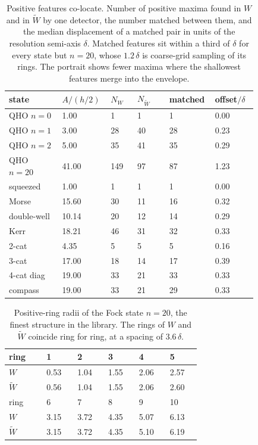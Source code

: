\documentclass[%
  aps, amsmath, amssymb, onecolumn, 11pt
]{revtex4-2}
\begin{document}
\begin{table}[ht]
\centering
\renewcommand{\arraystretch}{1.2}
\begin{tabular}{@{}p{0.20\linewidth} p{0.13\linewidth} p{0.10\linewidth} p{0.12\linewidth} p{0.12\linewidth} p{0.16\linewidth}@{}}
\toprule
state & $A/(h/2)$ & $N_W$ & $N_{\widetilde W}$ & matched & offset$/\delta$ \\
\midrule
QHO $n=0$    & 1.00  & 1   & 1  & 1  & 0.00 \\
QHO $n=1$    & 3.00  & 28  & 40 & 28 & 0.23 \\
QHO $n=2$    & 5.00  & 35  & 41 & 35 & 0.29 \\
QHO $n=20$   & 41.00 & 149 & 97 & 87 & 1.23 \\
squeezed     & 1.00  & 1   & 1  & 1  & 0.00 \\
Morse        & 15.60 & 30  & 11 & 16 & 0.32 \\
double-well  & 10.14 & 20  & 12 & 14 & 0.29 \\
Kerr         & 18.21 & 46  & 31 & 32 & 0.33 \\
2-cat        & 4.35  & 5   & 5  & 5  & 0.16 \\
3-cat        & 17.00 & 18  & 14 & 17 & 0.39 \\
4-cat diag   & 19.00 & 33  & 21 & 33 & 0.33 \\
compass      & 19.00 & 33  & 21 & 29 & 0.33 \\
\bottomrule
\end{tabular}
\caption{Positive features co-locate. Number of positive maxima found in $W$
and in $\widetilde W$ by one detector, the number matched between them, and the
median displacement of a matched pair in units of the resolution semi-axis $\delta$.
Matched features sit within a third of $\delta$ for every state but $n=20$,
whose $1.2\,\delta$ is coarse-grid sampling of its rings. The portrait shows
fewer maxima where the shallowest features merge into the envelope.}
\label{tab:coloc}
\end{table}

\begin{table}[ht]
\centering
\renewcommand{\arraystretch}{1.2}
\begin{tabular}{@{}p{0.14\linewidth} p{0.10\linewidth} p{0.10\linewidth} p{0.10\linewidth} p{0.10\linewidth} p{0.10\linewidth}@{}}
\toprule
ring & 1 & 2 & 3 & 4 & 5 \\
\midrule
$W$            & 0.53 & 1.04 & 1.55 & 2.06 & 2.57 \\
$\widetilde W$ & 0.56 & 1.04 & 1.55 & 2.06 & 2.60 \\
\midrule
ring & 6 & 7 & 8 & 9 & 10 \\
\midrule
$W$            & 3.15 & 3.72 & 4.35 & 5.07 & 6.13 \\
$\widetilde W$ & 3.15 & 3.72 & 4.35 & 5.10 & 6.19 \\
\bottomrule
\end{tabular}
\caption{Positive-ring radii of the Fock state $n=20$, the finest structure in
the library. The rings of $W$ and $\widetilde W$ coincide ring for ring, at a
spacing of $3.6\,\delta$.}
\label{tab:rings}
\end{table}
\end{document}
